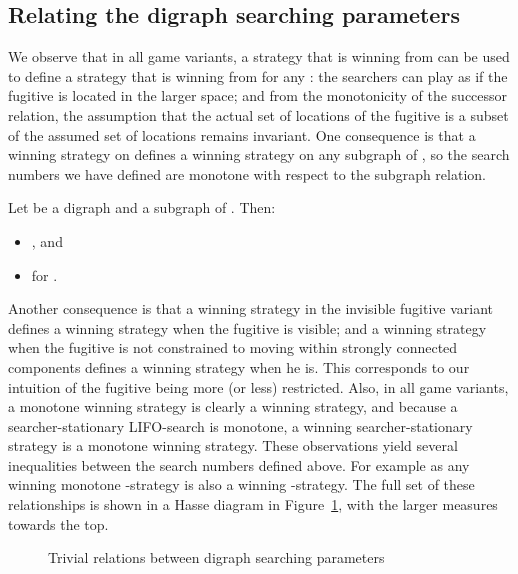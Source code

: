 \documentclass{llncs}
\begin{document}
\subsection{Relating the digraph searching parameters}
We observe that in all game variants, a strategy that is winning from  can be used to define a strategy that is winning from  for any : the searchers can play as if the fugitive is located in the larger space; and from the monotonicity of the successor relation, the assumption that the actual set of locations of the fugitive is a subset of the assumed set of locations remains invariant.  
One consequence is that a winning strategy on  defines a winning strategy on any subgraph of , so the search numbers we have defined are monotone with respect to the subgraph relation.

\begin{proposition}\label{prop:subgraph}
Let  be a digraph and  a subgraph of .  Then:
\begin{itemize}\item , and
\item  for .
\end{itemize}
\end{proposition}

Another consequence is that a winning strategy in the invisible fugitive variant defines a winning strategy when the fugitive is visible; and a winning strategy when the fugitive is not constrained to moving within strongly connected components defines a winning strategy when he is.  This corresponds to our intuition of the fugitive being more (or less) restricted.  Also, in all game variants, a monotone winning strategy is clearly a winning strategy, and because a searcher-stationary LIFO-search is monotone, a winning searcher-stationary strategy is a monotone winning strategy.  These observations yield several inequalities between the search numbers defined above.  For example  as any winning monotone -strategy is also a winning -strategy.  The full set of these relationships is shown in a Hasse diagram in Figure~\ref{fig:rel}, with the larger measures towards the top.

\begin{figure}

\caption{Trivial relations between digraph searching parameters}\label{fig:rel}
\end{figure}
\end{document}
